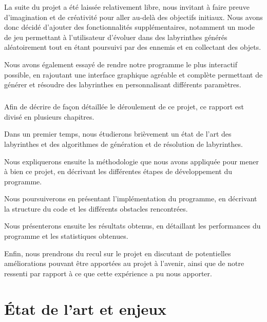 \documentclass[12pt]{scrreprt} %
\begin{document}
La suite du projet a été laissée relativement libre, nous invitant à faire preuve d'imagination et de créativité pour aller au-delà des objectifs initiaux. Nous avons donc décidé d'ajouter des fonctionnalités supplémentaires, notamment un mode de jeu permettant à l'utilisateur d'évoluer dans des labyrinthes générés aléatoirement tout en étant poursuivi par des ennemis et en collectant des objets.

Nous avons également essayé de rendre notre programme le plus interactif possible, en rajoutant une interface graphique agréable et complète permettant de générer et résoudre des labyrinthes en personnalisant différents paramètres.

\paragraph{}

Afin de décrire de façon détaillée le déroulement de ce projet, ce rapport est divisé en plusieurs chapitres.

Dans un premier temps, nous étudierons brièvement un état de l'art des labyrinthes et des algorithmes de génération et de résolution de labyrinthes.

Nous expliquerons ensuite la méthodologie que nous avons appliquée pour mener à bien ce projet, en décrivant les différentes étapes de développement du programme.

Nous poursuiverons en présentant l'implémentation du programme, en décrivant la structure du code et les différents obstacles rencontrées.

Nous présenterons ensuite les résultats obtenus, en détaillant les performances du programme et les statistiques obtenues.

Enfin, nous prendrons du recul sur le projet en discutant de potentielles améliorations pouvant être apportées au projet à l'avenir, ainsi que de notre ressenti par rapport à ce que cette expérience a pu nous apporter.
\chapter{État de l'art et enjeux}

\end{document}
